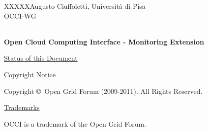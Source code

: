 \documentclass[10pt,a4paper]{article}
\newcommand{\doccode}{XXXXX}
\begin{document}
\thispagestyle{empty}

\doccode \hfill Augusto Ciuffoletti, Università di Pisa\\ 
OCCI-WG\\
\\

\vspace*{0.5in}

\begin{Large}
\textbf{Open Cloud Computing Interface - Monitoring Extension}
\end{Large}

\vspace*{0.5in}

\newcommand{\rem}[2]{}

\newcommand{\oc}[0]{\tt OCCI}
\newcommand{\mi}[0]{{\em mixin}}
\newcommand{\metr}[0]{{\em metric}}
\newcommand{\aggr}[0]{{\em aggregator}}
\newcommand{\publ}[0]{{\em publisher}}
\newcommand{\ent}[0]{{\em Entity}}
\newcommand{\rs}[0]{{\em Resource}}
\renewcommand{\ln}[0]{{\em Link}}
\newcommand{\sens}[0]{{\em Sensor}}
\newcommand{\comp}[0]{{\em Compute}}
\newcommand{\coll}[0]{{\em Collector}}

\newcommand{\extramixin}[3]{
\small
\begin{tabular}{ll}
\hline
Model attribute & value \\ \hline
scheme & http://acme.com/monitoring\# \\
term & #1 \\
related & http://schemas.ogf.org/occi/monitoring\##3 \\ 
attributes & 
  \scriptsize
  \begin{tabular}{|ll|p{3cm}|} \hline
  {\bf name} & {\bf type} &  Description \\ \hline
  #2 \hline
  \end{tabular} \\
\end{tabular}
}

\underline{Status of this Document}


\underline{Copyright Notice}

Copyright \copyright ~Open Grid Forum (2009-2011). All Rights Reserved.

\underline{Trademarks}

OCCI is a trademark of the Open Grid Forum.
\end{document}
